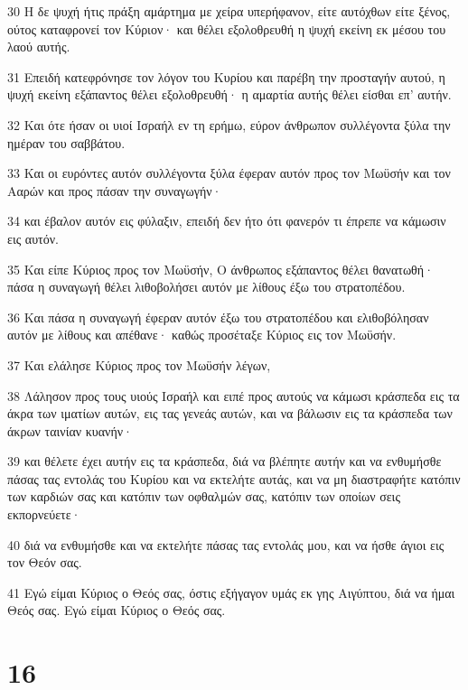 \par 30 Η δε ψυχή ήτις πράξη αμάρτημα με χείρα υπερήφανον, είτε αυτόχθων είτε ξένος, ούτος καταφρονεί τον Κύριον· και θέλει εξολοθρευθή η ψυχή εκείνη εκ μέσου του λαού αυτής.
\par 31 Επειδή κατεφρόνησε τον λόγον του Κυρίου και παρέβη την προσταγήν αυτού, η ψυχή εκείνη εξάπαντος θέλει εξολοθρευθή· η αμαρτία αυτής θέλει είσθαι επ' αυτήν.
\par 32 Και ότε ήσαν οι υιοί Ισραήλ εν τη ερήμω, εύρον άνθρωπον συλλέγοντα ξύλα την ημέραν του σαββάτου.
\par 33 Και οι ευρόντες αυτόν συλλέγοντα ξύλα έφεραν αυτόν προς τον Μωϋσήν και τον Ααρών και προς πάσαν την συναγωγήν·
\par 34 και έβαλον αυτόν εις φύλαξιν, επειδή δεν ήτο ότι φανερόν τι έπρεπε να κάμωσιν εις αυτόν.
\par 35 Και είπε Κύριος προς τον Μωϋσήν, Ο άνθρωπος εξάπαντος θέλει θανατωθή· πάσα η συναγωγή θέλει λιθοβολήσει αυτόν με λίθους έξω του στρατοπέδου.
\par 36 Και πάσα η συναγωγή έφεραν αυτόν έξω του στρατοπέδου και ελιθοβόλησαν αυτόν με λίθους και απέθανε· καθώς προσέταξε Κύριος εις τον Μωϋσήν.
\par 37 Και ελάλησε Κύριος προς τον Μωϋσήν λέγων,
\par 38 Λάλησον προς τους υιούς Ισραήλ και ειπέ προς αυτούς να κάμωσι κράσπεδα εις τα άκρα των ιματίων αυτών, εις τας γενεάς αυτών, και να βάλωσιν εις τα κράσπεδα των άκρων ταινίαν κυανήν·
\par 39 και θέλετε έχει αυτήν εις τα κράσπεδα, διά να βλέπητε αυτήν και να ενθυμήσθε πάσας τας εντολάς του Κυρίου και να εκτελήτε αυτάς, και να μη διαστραφήτε κατόπιν των καρδιών σας και κατόπιν των οφθαλμών σας, κατόπιν των οποίων σεις εκπορνεύετε·
\par 40 διά να ενθυμήσθε και να εκτελήτε πάσας τας εντολάς μου, και να ήσθε άγιοι εις τον Θεόν σας.
\par 41 Εγώ είμαι Κύριος ο Θεός σας, όστις εξήγαγον υμάς εκ γης Αιγύπτου, διά να ήμαι Θεός σας. Εγώ είμαι Κύριος ο Θεός σας.

\chapter{16}

